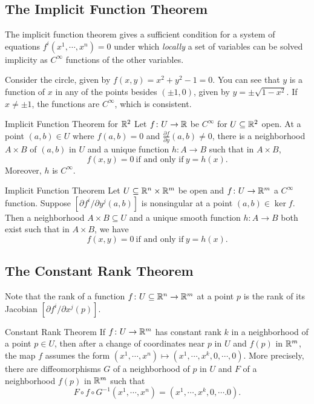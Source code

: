 \subsection{The Implicit Function Theorem}
The implicit function theorem gives a sufficient condition for a system of equations $f^i  (x^1,\cdots ,x^n )=0$ under which \emph{locally} a set of variables can be solved implicity as $C^{\infty}$ functions of the other variables.
\begin{example}
    Consider the circle, given by $f(x,y)=x^2+y^2-1=0$. You can see that $y$ is a function of $x$ in any of the points besides $(\pm 1,0)$, given by $y=\pm \sqrt{1-x^2} $. If $x\neq \pm 1$, the functions are $C^{\infty}$, which is consistent.
\end{example}
\begin{namedthm}{Implicit Function Theorem for $\mathbb{R}^2$}
    Let $f \colon U\to \mathbb{R}$ be $C^{\infty}$ for $U\subseteq \mathbb{R}^2$ open. At a point $(a,b) \in U$ where $f(a,b)=0$ and $\frac{\partial f}{\partial y}(a,b)\neq 0$, there is a neighborhood $A\times B$ of $(a,b)$ in $U$ and a unique function $h \colon A \to B$ such that in $A\times B$, \[
        f(x,y)=0 \ \text{if and only if} \ y=h(x).
    \] Moreover, $h$ is $C^{\infty}$.
\end{namedthm}
\begin{namedthm}{Implicit Function Theorem}
    Let $U \subseteq \mathbb{R}^n \times \mathbb{R}^m$ be open and $f \colon U \to \mathbb{R}^m$ a $C^{\infty}$ function. Suppose $[\partial f^i  / \partial y^j (a,b)]$ is nonsingular at a point $(a,b)\in  \ker f$. Then a neighborhood $A\times B\subseteq U$ and a unique smooth function $h\colon A \to B$ both exist such that in $A\times B$, we have \[
        f(x,y)=0 \ \text{if and only if} \ y=h(x).
    \] 
\end{namedthm}
\subsection{The Constant Rank Theorem}
Note that the rank of a function $f \colon U \subseteq \mathbb{R}^n  \to \mathbb{R}^m$ at a point $p$ is the rank of its Jacobian $[\partial f^i  / \partial x^j (p)]$.
\begin{namedthm}{Constant Rank Theorem}
    If $f \colon U  \to \mathbb{R}^m$ has constant rank $k$ in a neighborhood of a point $p \in U$, then after a change of coordinates near $p$ in $U$ and $f(p)$ in $\mathbb{R}^m$, the map $f$ assumes the form $(x^1,\cdots ,x^n ) \mapsto  (x^1,\cdots ,x^k, 0,\cdots ,0)$. More precisely, there are diffeomorphisms $G$ of a neighborhood of $p$ in $U$ and $F$ of a neighborhood $f(p)$ in $\mathbb{R}^m$ such that  \[
        F \circ f \circ G^{-1} (x^1,\cdots ,x^n )=(x^1,\cdots ,x^k,0,\cdots .0).
    \] 
\end{namedthm}

